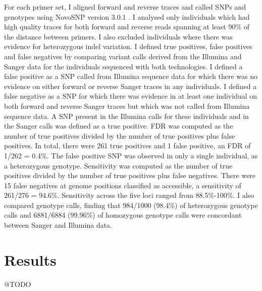 \documentclass[a4paper,11pt,abstracton,hidelinks]{scrartcl}
\begin{document}
For each primer set, I aligned forward and reverse traces and called SNPs and genotypes using NovoSNP version 3.0.1 \citep{Weckx2005}.
%
I analysed only individuals which had high quality traces for both forward and reverse reads spanning at least 90\% of the distance between primers.
%
I also excluded individuals where there was evidence for heterozygous indel variation.
%
I defined true positives, false positives and false negatives by comparing variant calls derived from the Illumina and Sanger data for the individuals sequenced with both technologies.
%
I defined a false positive as a SNP called from Illumina sequence data for which there was no evidence on either forward or reverse Sanger traces in any individuals.
%
I defined a false negative as a SNP for which there was evidence in at least one individual on both forward and reverse Sanger traces but which was not called from Illumina sequence data.
%
A SNP present in the Illumina calls for these individuals and in the Sanger calls was defined as a true positive.
%
FDR was computed as the number of true positives divided by the number of true positives plus false positives.
%
In total, there were 261 true positives and 1 false positive, an FDR of 1/262 = 0.4\%.
%
The false positive SNP was observed in only a single individual, as a heterozygous genotype.
%
Sensitivity was computed as the number of true positives divided by the number of true positives plus false negatives.
%
There were 15 false negatives at genome positions classified as accessible, a sensitivity of 261/276 = 94.6\%.
%
Sensitivity across the five loci ranged from 88.5\%-100\%.
%
I also compared genotype calls, finding that 984/1000 (98.4\%) of heterozygous genotype calls and 6881/6884 (99.96\%) of homozygous genotype calls were concordant between Sanger and Illumina data.


\section{Results}


@TODO


\end{document}
